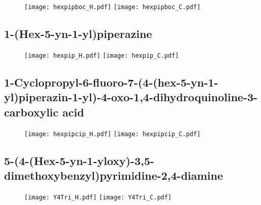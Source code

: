 \begin{figure}[H]
	\centering
		\texttt{[image: hexpipboc\_H.pdf]}
		\texttt{[image: hexpipboc\_C.pdf]}
\end{figure}

\subsection{1-(Hex-5-yn-1-yl)piperazine }

\begin{figure}[H]
	\centering
		\texttt{[image: hexpip\_H.pdf]}
		\texttt{[image: hexpip\_C.pdf]}
\end{figure}

\subsection{1-Cyclopropyl-6-fluoro-7-(4-(hex-5-yn-1-yl)piperazin-1-yl)-4-oxo-1,4\hyp{}dihydroqu\allowbreak inoline-3-carboxylic acid }

\begin{figure}[H]
	\centering
		\texttt{[image: hexpipcip\_H.pdf]}
		\texttt{[image: hexpipcip\_C.pdf]}
\end{figure}



\subsection{5-(4-(Hex-5-yn-1-yloxy)-3,5-dimethoxybenzyl)pyrimidine-2,4-diamine }

\begin{figure}[H]
	\centering
		\texttt{[image: Y4Tri\_H.pdf]}		\texttt{[image: Y4Tri\_C.pdf]}
\end{figure}

